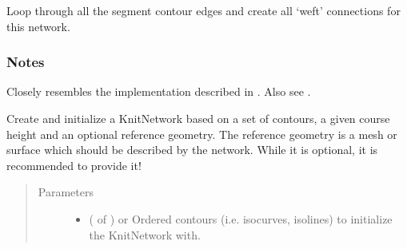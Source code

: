 \documentclass[letterpaper,10pt,english]{sphinxmanual}
\begin{document}
\begin{fulllineitems}
\begin{fulllineitems}
\end{fulllineitems}


\begin{fulllineitems}
\label{\detokenize{cockatoo:cockatoo.KnitNetwork.create_final_weft_connections}}
Loop through all the segment contour edges and create all ‘weft’
connections for this network.
\subsubsection*{Notes}

Closely resembles the implementation described in  \sphinxfootnotemark[1]. Also see
 \sphinxfootnotemark[2].

\end{fulllineitems}


\begin{fulllineitems}
\label{\detokenize{cockatoo:cockatoo.KnitNetwork.create_from_contours}}
Create and initialize a KnitNetwork based on a set of contours, a
given course height and an optional reference geometry.
The reference geometry is a mesh or surface which should be described
by the network. While it is optional, it is  recommended to
provide it!
\begin{quote}\begin{description}
\item[{Parameters}] \leavevmode\begin{itemize}
\item {} 
 ( of ) \textendash{} or 
Ordered contours (i.e. isocurves, isolines) to initialize the
KnitNetwork with.


\end{itemize}
\end{description}
\end{quote}
\end{fulllineitems}
\end{fulllineitems}
\end{document}
